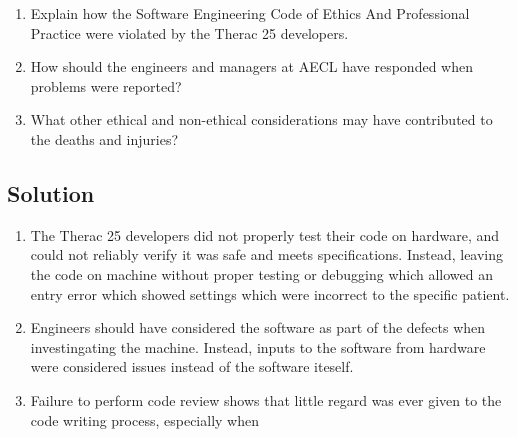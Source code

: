 \documentclass[letterpaper,11pt]{texMemo} %
\begin{document}
\begin{enumerate}[label=(\alph*)]
    \item Explain how the Software Engineering Code of Ethics And Professional Practice were violated by the Therac 25 developers.
    \item How should the engineers and managers at AECL have responded when problems were reported?
    \item What other ethical and non-ethical considerations may have contributed to the deaths and injuries?
\end{enumerate}
\subsection*{Solution}
\begin{enumerate}[label=(\alph*)]
  \item The Therac 25 developers did not properly test their code on hardware, and could not reliably verify it was safe and meets specifications.
  Instead, leaving the code on machine without proper testing or debugging which allowed an entry error which showed settings which were
  incorrect to the specific patient.
  \item Engineers should have considered the software as part of the defects when investingating the machine. Instead,
  inputs to the software from hardware were considered issues instead of the software iteself.
  \item Failure to perform code review shows that little regard was ever given to the code writing process,
  especially when 
\end{enumerate}
\end{document}
